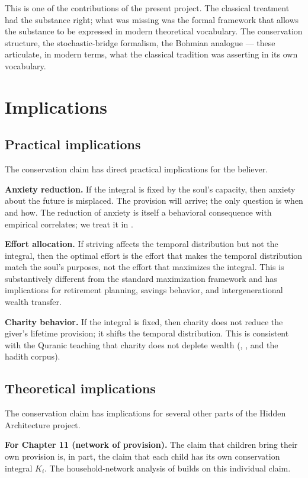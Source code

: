 This is one of the contributions of the present project. The
classical treatment had the substance right; what was missing was
the formal framework that allows the substance to be expressed in
modern theoretical vocabulary. The conservation structure, the
stochastic-bridge formalism, the Bohmian analogue --- these
articulate, in modern terms, what the classical tradition was
asserting in its own vocabulary.

\section{Implications}
\label{sec:rizq-implications}

\subsection{Practical implications}

The conservation claim has direct practical implications for the
believer.

\textbf{Anxiety reduction.} If the integral is fixed by the
soul's capacity, then anxiety about the future is misplaced. The
provision will arrive; the only question is when and how. The
reduction of anxiety is itself a behavioral consequence with
empirical correlates; we treat it in .

\textbf{Effort allocation.} If striving affects the temporal
distribution but not the integral, then the optimal effort is the
effort that makes the temporal distribution match the soul's
purposes, not the effort that maximizes the integral. This is
substantively different from the standard maximization framework
and has implications for retirement planning, savings behavior,
and intergenerational wealth transfer.

\textbf{Charity behavior.} If the integral is fixed, then charity
does not reduce the giver's lifetime provision; it shifts the
temporal distribution. This is consistent with the Quranic
teaching that charity does not deplete wealth (,
, and the hadith corpus).

\subsection{Theoretical implications}

The conservation claim has implications for several other parts of
the Hidden Architecture project.

\textbf{For Chapter 11 (network of provision).} The claim that
children bring their own provision is, in part, the claim that
each child has its own conservation integral $K_i$. The household-network
analysis of  builds on this individual
claim.

